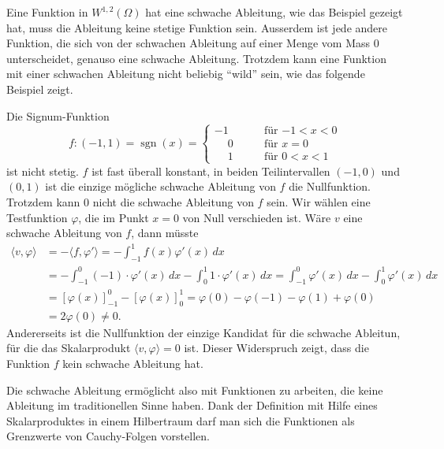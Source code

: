 Eine Funktion in $W^{1,2}(\Omega)$ hat eine schwache Ableitung,
wie das Beispiel gezeigt hat, muss die Ableitung keine stetige
Funktion sein.
Ausserdem ist jede andere Funktion, die sich von der schwachen
Ableitung auf einer Menge vom Mass 0 unterscheidet, genauso eine
schwache Ableitung.
Trotzdem kann eine Funktion mit einer schwachen Ableitung nicht
beliebig ``wild'' sein, wie das folgende Beispiel zeigt.

\begin{beispiel}
Die Signum-Funktion
\[
f\colon (-1,1) = \operatorname{sgn}(x) =
\begin{cases}
         - 1&\qquad\text{für $-1<x<0$}\\
\phantom{-}0&\qquad\text{für $x=0$}\\
\phantom{-}1&\qquad\text{für $0<x<1$}
\end{cases}
\]
ist nicht stetig.
$f$ ist fast überall konstant, in beiden Teilintervallen $(-1,0)$ und
$(0,1)$ ist die einzige mögliche schwache Ableitung von $f$ die
Nullfunktion.
Trotzdem kann $0$ nicht die schwache Ableitung von $f$ sein.
Wir wählen eine Testfunktion $\varphi$, die im Punkt $x=0$ von
Null verschieden ist.
Wäre $v$ eine schwache Ableitung von $f$, dann müsste
\begin{align*}
\langle v,\varphi\rangle
&=
-\langle f,\varphi'\rangle
=
-\int_{-1}^1 f(x) \varphi'(x)\,dx
\\
&=
-\int_{-1}^0 (-1)\cdot \varphi'(x)\,dx
-\int_{0}^1 1\cdot \varphi'(x)\,dx
=
\int_{-1}^0 \varphi'(x)\,dx
-
\int_{0}^1 \varphi'(x)\,dx
\\
&=
[\varphi(x)]_{-1}^0
-
[\varphi(x)]_{0}^1
=
\varphi(0)-\varphi(-1)
-
\varphi(1)+\varphi(0)
\\
&=
2\varphi(0)
\ne 0.
\end{align*}
Andererseits ist die Nullfunktion der einzige Kandidat für die
schwache Ableitun, für die das Skalarprodukt $\langle v,\varphi\rangle=0$
ist.
Dieser Widerspruch zeigt, dass die Funktion $f$ kein schwache
Ableitung hat.
\end{beispiel}

Die schwache Ableitung ermöglicht also mit Funktionen zu arbeiten,
die keine Ableitung im traditionellen Sinne haben.
Dank der Definition mit Hilfe eines Skalarproduktes in einem 
Hilbertraum darf man sich die Funktionen als Grenzwerte von
Cauchy-Folgen vorstellen.

%
%
